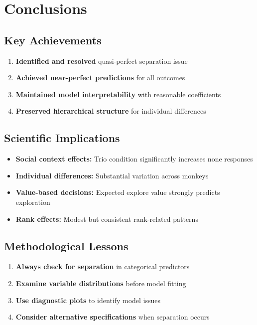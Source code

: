 \documentclass[11pt]{article}
\begin{document}
\section{Conclusions}

\subsection{Key Achievements}

\begin{enumerate}
    \item \textbf{Identified and resolved} quasi-perfect separation issue
    \item \textbf{Achieved near-perfect predictions} for all outcomes
    \item \textbf{Maintained model interpretability} with reasonable coefficients
    \item \textbf{Preserved hierarchical structure} for individual differences
\end{enumerate}

\subsection{Scientific Implications}

\begin{itemize}
    \item \textbf{Social context effects:} Trio condition significantly increases none responses
    \item \textbf{Individual differences:} Substantial variation across monkeys
    \item \textbf{Value-based decisions:} Expected explore value strongly predicts exploration
    \item \textbf{Rank effects:} Modest but consistent rank-related patterns
\end{itemize}

\subsection{Methodological Lessons}

\begin{enumerate}
    \item \textbf{Always check for separation} in categorical predictors
    \item \textbf{Examine variable distributions} before model fitting
    \item \textbf{Use diagnostic plots} to identify model issues
    \item \textbf{Consider alternative specifications} when separation occurs
\end{enumerate}
\end{document}
